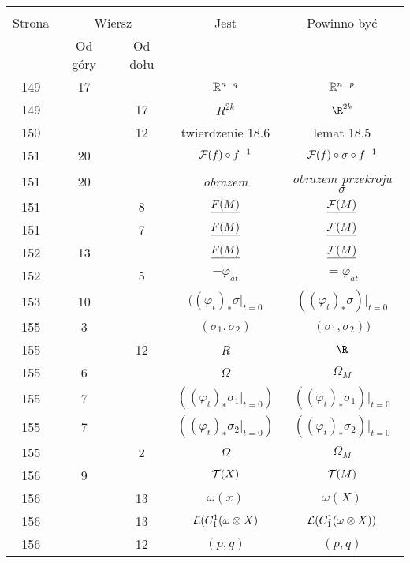 \documentclass[a4paper,11pt]{article}
\begin{document}
\begin{center}
  \begin{tabular}{|c|c|c|c|c|}
    \hline
    & \multicolumn{2}{c|}{} & & \\
    Strona & \multicolumn{2}{c|}{Wiersz} & Jest
                              & Powinno być \\ \cline{2-3}
    & Od góry & Od dołu & & \\
    \hline
    149 & 17 & & $\mathbb{R}^{ n - q }$ & $\mathbb{R}^{ n - p }$ \\
    149 & & 17 & $R^{ 2k }$ & $\R^{ 2k }$ \\
    150 & & 12 & twierdzenie 18.6 & lemat 18.5 \\
    151 & 20 & & $\mathcal{F}( f ) \circ f^{ -1 }$
           & $\mathcal{F}( f ) \circ \sigma \circ f^{ -1 }$ \\
    151 & 20 & & \emph{obrazem} & \emph{obrazem przekroju} $\sigma$ \\
    151 & &  8 & $\underline{ F( M ) }$ & $\underline{ \mathcal{F}( M ) }$ \\
    151 & &  7 & $\underline{ F( M ) }$ & $\underline{ \mathcal{F}( M ) }$ \\
    152 & 13 & & $\underline{ F( M ) }$ & $\underline{ \mathcal{F}( M ) }$ \\
    152 & &  5 & $-\varphi_{ a t }$ & $= \varphi_{ a t }$ \\
    153 & 10 & & $( ( \varphi_{ t } )_{ * } \sigma \bigg|_{ t = 0 }$
           & $( ( \varphi_{ t } )_{ * } \sigma )\bigg|_{ t = 0 }$ \\
    155 &  3 & & $( \sigma_{ 1 }, \sigma_{ 2 } )$
           & $( \sigma_{ 1 }, \sigma_{ 2 } ) )$ \\
    155 & & 12 & \emph{R} & \emph{$\R$} \\
    155 &  6 & & $\Omega$ & $\Omega_{ M }$ \\
    155 &  7 & & $( ( \varphi_{ t } )_{ * } \sigma_{ 1 } \bigg|_{ t = 0 } )$
           & $( ( \varphi_{ t } )_{ * } \sigma_{ 1 } )\bigg|_{ t = 0 }$ \\
    155 &  7 & & $( ( \varphi_{ t } )_{ * } \sigma_{ 2 } \bigg|_{ t = 0 } )$
           & $( ( \varphi_{ t } )_{ * } \sigma_{ 2 } )\bigg|_{ t = 0 }$ \\
    155 & &  2 & $\Omega$ & $\Omega_{ M }$ \\
    156 &  9 & & $\mathcal{T}( X )$ & $\mathcal{T}( M )$ \\
    156 & & 13 & $\omega( x )$ & $\omega( X )$ \\
    156 & & 13 & $\mathcal{L}( C^{ 1 }_{ 1 }( \omega \otimes X )$
           & $\mathcal{L}( C^{ 1 }_{ 1 }( \omega \otimes X ) )$ \\
    156 & & 12 & $( p, g )$ & $( p, q )$ \\

\end{tabular}
\end{center}
\end{document}
